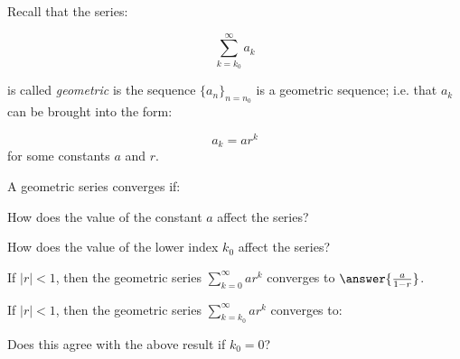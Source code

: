 \documentclass{ximera}
\author{Jim Talamo}
\begin{document}
\begin{exercise}
Recall that the series:

\[
\sum_{k=k_0}^{\infty} a_k
\]

is called \emph{geometric} is the sequence $\{a_n\}_{n=n_0}$ is a geometric sequence; i.e. that  $a_k$ can be brought into the form:

\[
a_k = ar^k
\]
for some constants $a$ and $r$.

\begin{exercise}
A geometric series converges if:
\begin{multipleChoice}
\end{multipleChoice}

\end{exercise}
How does the value of the constant $a$ affect the series?
\begin{multipleChoice}
\end{multipleChoice}

How does the value of the lower index $k_0$ affect the series?
\begin{multipleChoice}
\end{multipleChoice}

\begin{exercise}
If $|r|<1$, then the geometric series $\sum_{k=0}^{\infty} ar^k$ converges to $\answer{\frac{a}{1-r}}$.

\begin{exercise}
If $|r|<1$, then the geometric series $\sum_{k=k_0}^{\infty} ar^k$ converges to:

\begin{multipleChoice}
\end{multipleChoice}

Does this agree with the above result if $k_0=0$?

\begin{multipleChoice}
\end{multipleChoice}
\end{exercise}
\end{exercise}


\end{exercise}
\end{document}
